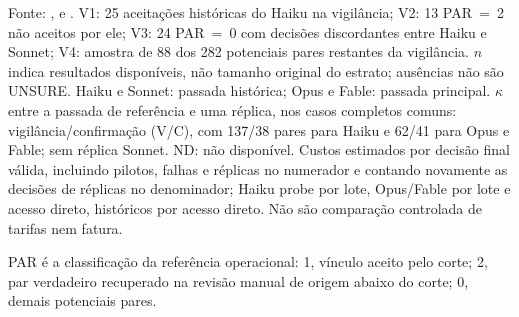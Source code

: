 \begin{table}[!htbp]
\centering
\caption{Comparação exploratória \textit{post hoc} de quatro modelos como revisores, relativa à referência PAR.}
\label{tab:cap8-tamanho-modelo}
\small
{}
\medskip
{}
\par\footnotesize Fonte: ,  e . V1: 25 aceitações históricas do Haiku na vigilância; V2: 13 PAR~=~2 não aceitos por ele; V3: 24 PAR~=~0 com decisões discordantes entre Haiku e Sonnet; V4: amostra de 88 dos 282 potenciais pares restantes da vigilância. $n$ indica resultados disponíveis, não tamanho original do estrato; ausências não são UNSURE. Haiku e Sonnet: passada histórica; Opus e Fable: passada principal. $\kappa$ entre a passada de referência e uma réplica, nos casos completos comuns: vigilância/confirmação (V/C), com 137/38 pares para Haiku e 62/41 para Opus e Fable; sem réplica Sonnet. ND: não disponível. Custos estimados por decisão final válida, incluindo pilotos, falhas e réplicas no numerador e contando novamente as decisões de réplicas no denominador; Haiku probe por lote, Opus/Fable por lote e acesso direto, históricos por acesso direto. Não são comparação controlada de tarifas nem fatura.
\par\footnotesize PAR é a classificação da referência operacional: 1, vínculo aceito pelo corte; 2, par verdadeiro recuperado na revisão manual de origem abaixo do corte; 0, demais potenciais pares.
\end{table}
